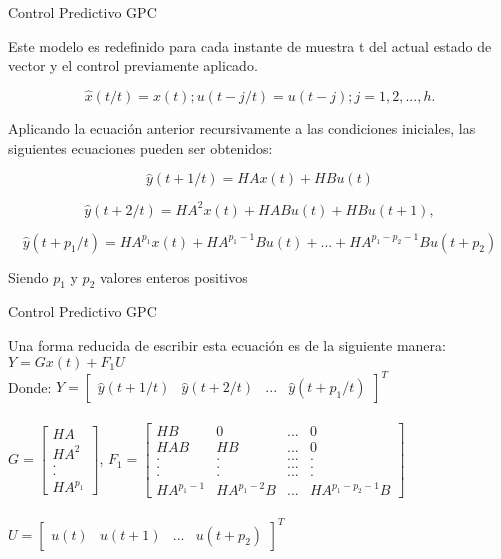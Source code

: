 \documentclass{beamer}
\begin{document}
\begin{frame}{Control Predictivo GPC}
\begin{justify}


Este modelo es redefinido para cada instante de muestra t  del actual estado de vector y el control previamente aplicado.

$$\hat{x}(t/t)=x(t); u(t-j/t)=u(t-j); j=1,2,...,h.$$

\vspace{0.3cm}
Aplicando la ecuación anterior recursivamente a las condiciones iniciales, las siguientes ecuaciones pueden ser obtenidos:

$$\hat{y}(t+1/t)= HAx(t)+HBu(t)$$

$$\hat{y}(t+2/t)= HA^2x(t)+HABu(t)+HBu(t+1),$$

$$\hat{y}(t+p_1/t)=HA^{p_1}x(t)+HA^{p_{1}-1}Bu(t)+...+HA^{p_{1}-p_{2}-1}Bu(t+p_2)$$

Siendo $p_1$ y $p_2$ valores enteros positivos
\end{justify}
\end{frame}



\begin{frame}{Control Predictivo GPC}
\begin{justify}
\begin{itemize}
Una forma reducida de escribir esta ecuación es de la siguiente manera:
$Y=Gx(t)+F_1 U$
\\ 

\vspace{0.3cm}
Donde:
\centering
\hfill \break
$Y=\begin{bmatrix}\hat{y}(t+1/t) &\hat{y}(t+2/t)&...& \hat{y}(t+p_1/t)
\end{bmatrix} ^T$
\\
\hfill \break
\\
$G=
\begin{bmatrix}
    HA \\
    HA^2\\
    . \\
    .\\
    HA^{p_1}
\end{bmatrix}$,
$F_1=
\begin{bmatrix}
    HB & 0 & ... & 0 \\
    HAB & HB & ... & 0\\
    . & . & ... & . \\
    . & . & ... & . \\
    . & . & ... & . \\
    HA^{p_1-1} & HA^{p_1-2}B & ... & HA^{p_1-p_2-1}B
\end{bmatrix}
$
\\
\hfill \break
\\
$U=\begin{bmatrix}u(t)& u(t+1)&...& u(t+p_2)\end{bmatrix}^T$ 
\\

\end{itemize}
\end{justify}
\end{frame}
\end{document}

